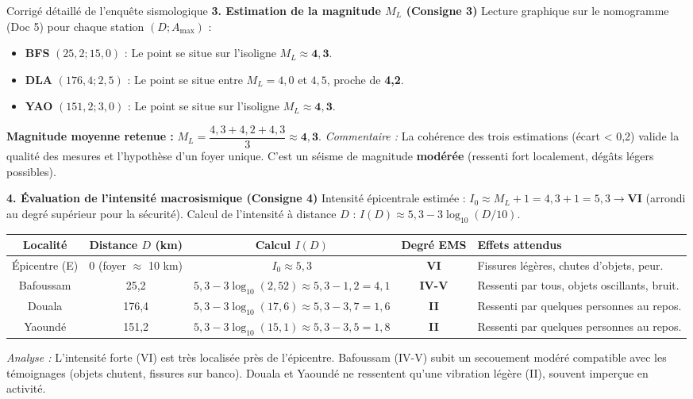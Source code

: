 \documentclass[11pt]{article}
\begin{document}
\begin{exoresolu}{Corrigé détaillé de l'enquête sismologique}
\medskip
\textbf{3. Estimation de la magnitude $M_L$ (Consigne 3)}
\medskip
Lecture graphique sur le nomogramme (Doc 5) pour chaque station $(D ; A_{\text{max}})$ :
\begin{itemize}
    \item \textbf{BFS} $(25,2 ; 15,0)$ : Le point se situe sur l'isoligne $M_L \approx \mathbf{4,3}$.
    \item \textbf{DLA} $(176,4 ; 2,5)$ : Le point se situe entre $M_L = 4,0$ et $4,5$, proche de \textbf{4,2}.
    \item \textbf{YAO} $(151,2 ; 3,0)$ : Le point se situe sur l'isoligne $M_L \approx \mathbf{4,3}$.
\end{itemize}
\noindent\textbf{Magnitude moyenne retenue :} $M_L = \dfrac{4,3 + 4,2 + 4,3}{3} \approx \mathbf{4,3}$.
\noindent\textit{Commentaire :} La cohérence des trois estimations (écart < 0,2) valide la qualité des mesures et l'hypothèse d'un foyer unique. C'est un séisme de magnitude \textbf{modérée} (ressenti fort localement, dégâts légers possibles).

\medskip
\textbf{4. Évaluation de l'intensité macrosismique (Consigne 4)}
\medskip
Intensité épicentrale estimée : $I_0 \approx M_L + 1 = 4,3 + 1 = 5,3 \rightarrow \mathbf{VI}$ (arrondi au degré supérieur pour la sécurité).
\medskip
Calcul de l'intensité à distance $D$ : $I(D) \approx 5,3 - 3 \log_{10}(D/10)$.
\begin{center}
\begin{tabularx}{\linewidth}{|c|c|c|c|X|}\hline
\textbf{Localité} & \textbf{Distance $D$ (km)} & \textbf{Calcul $I(D)$} & \textbf{Degré EMS} & \textbf{Effets attendus} \\ \hline
Épicentre (E) & 0 (foyer $\approx$ 10 km) & $I_0 \approx 5,3$ & \textbf{VI} & Fissures légères, chutes d'objets, peur. \\ \hline
Bafoussam & 25,2 & $5,3 - 3 \log_{10}(2,52) \approx 5,3 - 1,2 = 4,1$ & \textbf{IV-V} & Ressenti par tous, objets oscillants, bruit. \\ \hline
Douala & 176,4 & $5,3 - 3 \log_{10}(17,6) \approx 5,3 - 3,7 = 1,6$ & \textbf{II} & Ressenti par quelques personnes au repos. \\ \hline
Yaoundé & 151,2 & $5,3 - 3 \log_{10}(15,1) \approx 5,3 - 3,5 = 1,8$ & \textbf{II} & Ressenti par quelques personnes au repos. \\ \hline
\end{tabularx}
\end{center}
\noindent\textit{Analyse :} L'intensité forte (VI) est très localisée près de l'épicentre. Bafoussam (IV-V) subit un secouement modéré compatible avec les témoignages (objets chutent, fissures sur banco). Douala et Yaoundé ne ressentent qu'une vibration légère (II), souvent imperçue en activité.


\end{exoresolu}
\end{document}
